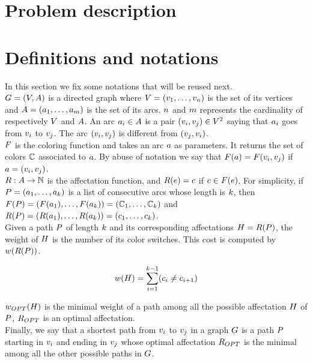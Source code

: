 \section{Problem description}

\section{Definitions and notations}

In this section we fix some notations that will be reused next.\\
$G = (V, A)$ is a directed graph where $V = (v_1,\ldots,v_{n})$ is the set of its vertices and $A = (a_1,\ldots,a_{m})$ is the set of its arcs. $n$ and $m$ represents the cardinality of respectively $V$ and $A$. An arc $a_i \in A$ is a pair $(v_i, v_j) \in V^2$ saying that $a_i$ goes from $v_i$ to $v_j$. The arc $(v_i, v_j)$ is different from $(v_j, v_i)$.\\
$F$ is the coloring function and takes an arc $a$ as parameters. It returns the set of colors $\mathbb{C}$ associated to $a$. By abuse of notation we say that $F(a) = F(v_i, v_j)$ if $a = (v_i, v_j)$.\\
$R: A \rightarrow \mathbb{N} $ is the affectation function, and $R(e) = c$ if $c \in F(e)$. For simplicity, if $P = (a_1,\ldots,a_{k})$ is a list of consecutive arcs whose length is $k$, then $F(P) = (F(a_1), \dots, F(a_k)) = (\mathbb{C}_1,\ldots,\mathbb{C}_{k})$ and $R(P) = (R(a_1), \dots, R(a_k))  = (c_1,\ldots,c_{k})$.\\
Given a path $P$ of length $k$ and its corresponding affectations $H = R(P)$, the weight of $H$ is the number of its color switches. This cost is computed by $w(R(P))$.

\begin{equation}
  \label{eq:costf}
  w(H) = \sum\limits_{i = 1}^{k-1} (c_i \neq c_{i+1})
\end{equation}

$w_{OPT}(H)$ is the minimal weight of a path among all the possible affectation $H$ of $P$, $R_{OPT}$ is an optimal affectation.\\
Finally, we say that a shortest path from $v_i$ to $v_j$ in a graph $G$ is a path $P$ starting in $v_i$ and ending in $v_j$ whose optimal affectation $R_{OPT}$ is the minimal among all the other possible paths in $G$.